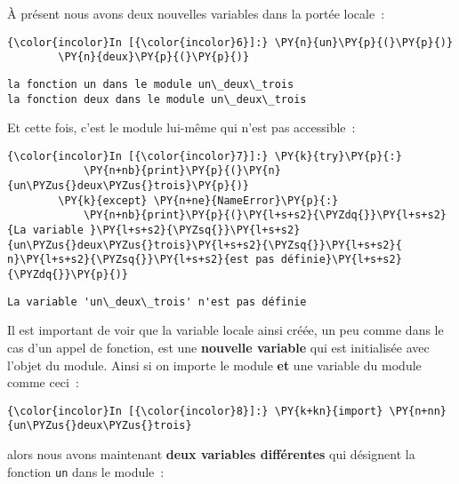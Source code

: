     À présent nous avons deux nouvelles variables dans la portée locale~:

    \begin{Verbatim}[commandchars=\\\{\}]
{\color{incolor}In [{\color{incolor}6}]:} \PY{n}{un}\PY{p}{(}\PY{p}{)}
        \PY{n}{deux}\PY{p}{(}\PY{p}{)}
\end{Verbatim}


    \begin{Verbatim}[commandchars=\\\{\}]
la fonction un dans le module un\_deux\_trois
la fonction deux dans le module un\_deux\_trois

    \end{Verbatim}

    Et cette fois, c'est le module lui-même qui n'est pas accessible~:

    \begin{Verbatim}[commandchars=\\\{\}]
{\color{incolor}In [{\color{incolor}7}]:} \PY{k}{try}\PY{p}{:}
            \PY{n+nb}{print}\PY{p}{(}\PY{n}{un\PYZus{}deux\PYZus{}trois}\PY{p}{)}
        \PY{k}{except} \PY{n+ne}{NameError}\PY{p}{:}
            \PY{n+nb}{print}\PY{p}{(}\PY{l+s+s2}{\PYZdq{}}\PY{l+s+s2}{La variable }\PY{l+s+s2}{\PYZsq{}}\PY{l+s+s2}{un\PYZus{}deux\PYZus{}trois}\PY{l+s+s2}{\PYZsq{}}\PY{l+s+s2}{ n}\PY{l+s+s2}{\PYZsq{}}\PY{l+s+s2}{est pas définie}\PY{l+s+s2}{\PYZdq{}}\PY{p}{)}
\end{Verbatim}


    \begin{Verbatim}[commandchars=\\\{\}]
La variable 'un\_deux\_trois' n'est pas définie

    \end{Verbatim}

    Il est important de voir que la variable locale ainsi créée, un peu
comme dans le cas d'un appel de fonction, est une \textbf{nouvelle
variable} qui est initialisée avec l'objet du module. Ainsi si on
importe le module \textbf{et} une variable du module comme ceci~:

    \begin{Verbatim}[commandchars=\\\{\}]
{\color{incolor}In [{\color{incolor}8}]:} \PY{k+kn}{import} \PY{n+nn}{un\PYZus{}deux\PYZus{}trois}
\end{Verbatim}


    alors nous avons maintenant \textbf{deux variables différentes} qui
désignent la fonction \texttt{un} dans le module~:

